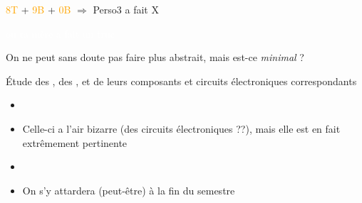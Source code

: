 \begin{frame}
\begin{itemize}
{     \item[Concl.] \textcolor{orange}{8T} + \textcolor{orange}{9B} + \textcolor{orange}{0B} $\Rightarrow$ Perso3 a fait X
     }
     
      \pause
      \pause
      \pause
      \item \textcolor{white}{ou ta mère a fait un truc}
      \item On ne peut sans doute pas faire plus abstrait\pause , mais est-ce \textit{minimal} ?
     
\end{itemize}
\end{frame}
 	


\begin{frame}

	\begin{description}[labelindent=6pt,style=multiline,leftmargin=1.3in]
		 \setlength\itemsep{1.4em}
	  \item[Larousse ter] Étude des , des , et de leurs composants et circuits électroniques correspondants\pause
	\end{description}

\begin{itemize}
\item[] 
\item[] Celle-ci a l'air bizarre (des circuits électroniques ??)\pause , mais elle est en fait extrêmement pertinente\pause
\item[]
\item[] On s'y attardera (peut-être) à la fin du semestre
\end{itemize}
\end{frame}
 	
